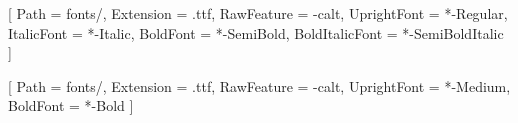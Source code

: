 
\newif\ifonepager
\ifdefined\ONEPAGER\onepagertrue\fi

\usepackage[a4paper,top=1.35cm,bottom=1.2cm,left=1.5cm,right=1.5cm]{geometry}
\usepackage{fontspec}
\usepackage{xcolor}
\usepackage{enumitem}
\usepackage{titlesec}
\usepackage{graphicx}
\usepackage{eso-pic}
\usepackage{microtype}
\usepackage[hidelinks]{hyperref}



\setmainfont{Inter}[
  Path = fonts/, Extension = .ttf, RawFeature = {-calt},
  UprightFont = *-Regular, ItalicFont = *-Italic,
  BoldFont = *-SemiBold, BoldItalicFont = *-SemiBoldItalic ]

\newfontfamily{}[
  Path = fonts/, Extension = .ttf, RawFeature = {-calt},
  UprightFont = *-Medium, BoldFont = *-Bold ]
\newcommand*{\displaylight}{\fontspec{SpaceGrotesk}[Path=fonts/,Extension=.ttf,RawFeature={-calt},UprightFont=*-Light]}

\newcommand*{\bodylight}{\fontspec{Inter}[Path=fonts/,Extension=.ttf,RawFeature={-calt},UprightFont=*-Light]}
\newcommand*{\bodymedium}{\fontspec{Inter}[Path=fonts/,Extension=.ttf,RawFeature={-calt},UprightFont=*-Medium]}

